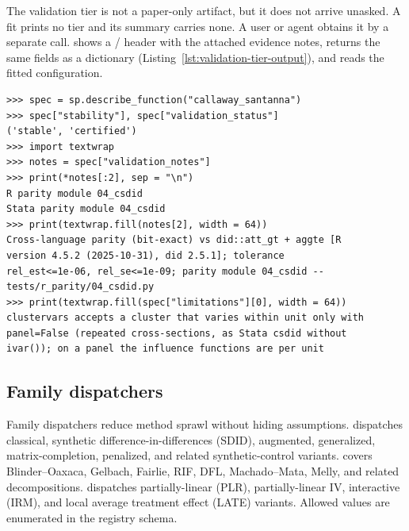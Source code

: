 The validation tier is not a paper-only artifact, but it does not arrive
unasked. A fit prints no tier and its summary carries none. A user or
agent obtains it by a separate call.  shows a
/ header with the attached evidence
notes,  returns the same fields as a
dictionary (Listing~\ref{lst:validation-tier-output}), and
 reads the fitted configuration.

\begin{lstlisting}[caption={The validation tier is available through the
same discovery surface used by users and agents; this excerpt is
generated from \code{sp.describe\_function("callaway\_santanna")}. ``Bit-exact''
is the registry's name for the tolerance tier that follows it, not a
claim of identical bits.},%
label={lst:validation-tier-output},captionpos=b]
>>> spec = sp.describe_function("callaway_santanna")
>>> spec["stability"], spec["validation_status"]
('stable', 'certified')
>>> import textwrap
>>> notes = spec["validation_notes"]
>>> print(*notes[:2], sep = "\n")
R parity module 04_csdid
Stata parity module 04_csdid
>>> print(textwrap.fill(notes[2], width = 64))
Cross-language parity (bit-exact) vs did::att_gt + aggte [R
version 4.5.2 (2025-10-31), did 2.5.1]; tolerance
rel_est<=1e-06, rel_se<=1e-09; parity module 04_csdid --
tests/r_parity/04_csdid.py
>>> print(textwrap.fill(spec["limitations"][0], width = 64))
clustervars accepts a cluster that varies within unit only with
panel=False (repeated cross-sections, as Stata csdid without
ivar()); on a panel the influence functions are per unit
\end{lstlisting}

\subsection{Family dispatchers}\label{sec:dispatcher}

Family dispatchers reduce method sprawl without hiding assumptions.
 dispatches classical, synthetic difference-in-differences
(SDID), augmented, generalized, matrix-completion, penalized, and related
synthetic-control variants.  covers Blinder--Oaxaca,
Gelbach, Fairlie, RIF, DFL, Machado--Mata, Melly, and related
decompositions.  dispatches partially-linear (PLR),
partially-linear IV, interactive (IRM), and local average treatment
effect (LATE) variants. Allowed  values are enumerated in
the registry schema.

